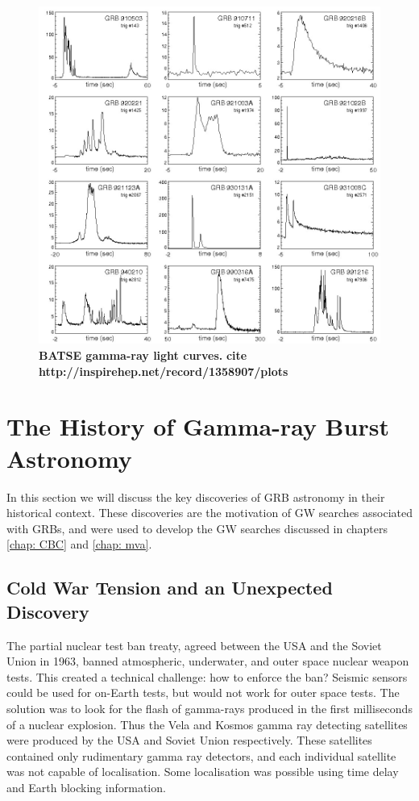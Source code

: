 \documentclass[11pt]{cuthesis}
\begin{document}
\begin{figure} %
\begin{center}
\includegraphics[width=1.0\linewidth]{grb_lightcurves.png}
\end{center}
\caption{\textbf{BATSE gamma-ray light curves.}  \textbf{cite http://inspirehep.net/record/1358907/plots} }
\label{fig:grb lightcurves}
\end{figure}

\section{The History of Gamma-ray Burst Astronomy} \label{sec:GRB history}
In this section we will discuss the key discoveries of GRB astronomy in their historical context. These discoveries are the motivation of GW searches associated with GRBs, and were used to develop the GW searches discussed in chapters \ref{chap: CBC} and \ref{chap: mva}.  

\subsection{Cold War Tension and an Unexpected Discovery} \label{sec:cold war}
The partial nuclear test ban treaty, agreed between the USA and the Soviet Union in 1963, banned atmospheric, underwater, and outer space nuclear weapon tests. This created a technical challenge: how to enforce the ban? Seismic sensors could be used for on-Earth tests, but would not work for outer space tests. The solution was to look for the flash of gamma-rays produced in the first milliseconds of a nuclear explosion. Thus the Vela and Kosmos gamma ray detecting satellites were produced by the USA and Soviet Union respectively. These satellites contained only rudimentary gamma ray detectors, and each individual satellite was not capable of localisation. Some localisation was possible using time delay and Earth blocking information.
\end{document}
